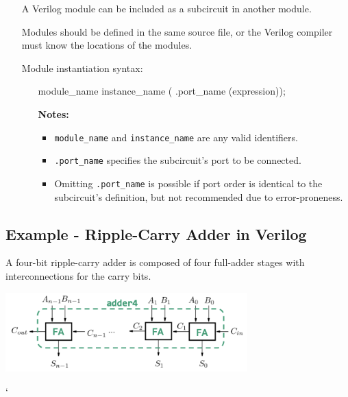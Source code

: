 \documentclass[12pt,openany, tikz,border=10pt]{book}
\begin{document}
			      	\begin{itemize}
			      		\item[] A Verilog module can be included as a subcircuit in another module.
			      		\item[] Modules should be defined in the same source file, or the Verilog compiler must know the locations of the modules.
			      		\item[] Module instantiation syntax:
			      		      \begin{itemize}
			      		      	\item[] \begin{vhdl}
{module\_name instance\_name ( .port\_name (expression));}
			      		      	\end{vhdl}
			      		      	\item[\textbf{Notes:}]
			      		      	      \begin{itemize}
			      		      	      	\item \texttt{module\_name} and \texttt{instance\_name} are any valid identifiers.
			      		      	      	\item \texttt{.port\_name} specifies the subcircuit's port to be connected.
			      		      	      	\item Omitting \texttt{.port\_name} is possible if port order is identical to the subcircuit's definition, but not recommended due to error-proneness.
			      		      	      \end{itemize}
			      		      \end{itemize}
			      	\end{itemize}
			      	
			      	\subsection{Example - Ripple-Carry Adder in Verilog}
			      	A four-bit ripple-carry adder is composed of four full-adder stages with interconnections for the carry bits.
			      	
			      	
			      	\begin{center}
			      		\includegraphics[width=0.70\textwidth]{circuits/10.2.4_2.png}
			      	\end{center}`
			      	
\end{document}
